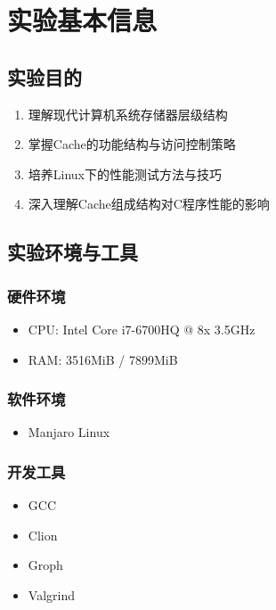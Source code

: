 \section{实验基本信息}

\subsection{实验目的}
\begin{enumerate}
    \item 理解现代计算机系统存储器层级结构
    \item 掌握Cache的功能结构与访问控制策略
    \item 培养Linux下的性能测试方法与技巧
    \item 深入理解Cache组成结构对C程序性能的影响
\end{enumerate}

\subsection{实验环境与工具}

\subsubsection{硬件环境}
\begin{itemize}
    \item CPU: Intel Core i7-6700HQ @ 8x 3.5GHz
    \item RAM: 3516MiB / 7899MiB
\end{itemize}

\subsubsection{软件环境}
\begin{itemize}
    \item Manjaro Linux

\end{itemize}

\subsubsection{开发工具}
\begin{itemize}
    \item GCC
    \item Clion
    \item Groph
    \item Valgrind
\end{itemize}